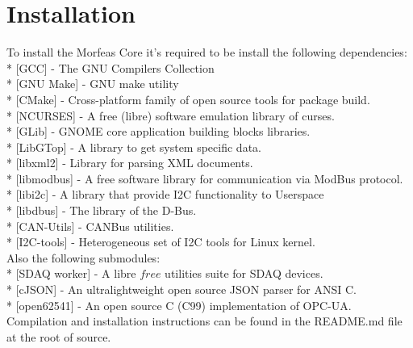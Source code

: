 \section{Installation}
To install the Morfeas Core it's required to be install the following dependencies:\\
* [GCC] - The GNU Compilers Collection\\
* [GNU Make] - GNU make utility\\
* [CMake] - Cross-platform family of open source tools for package build.\\
* [NCURSES] - A free (libre) software emulation library of curses.\\
* [GLib] - GNOME core application building blocks libraries.\\
* [LibGTop] - A library to get system specific data.\\
* [libxml2] - Library for parsing XML documents.\\
* [libmodbus] - A free software library for communication via ModBus protocol.\\
* [libi2c] - A library that provide I2C functionality to Userspace\\
* [libdbus] - The library of the D-Bus.\\
* [CAN-Utils] - CANBus utilities.\\
* [I2C-tools] - Heterogeneous set of I2C tools for Linux kernel.\\
Also the following submodules:\\
* [SDAQ worker] - A libre \(free\) utilities suite for SDAQ devices.\\
* [cJSON] - An ultralightweight open source JSON parser for ANSI C.\\
* [open62541] - An open source C (C99) implementation of OPC-UA.\\

Compilation and installation instructions can be found in the README.md file at the root of source.
